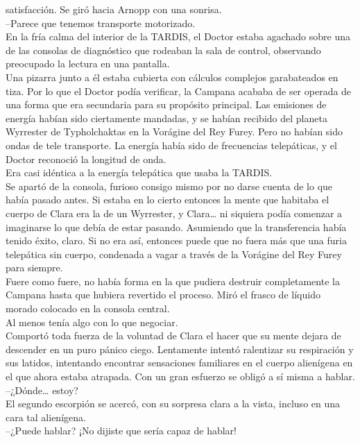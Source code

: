 satisfacción. Se giró hacia Arnopp con una sonrisa.\\
--Parece que tenemos transporte motorizado.\\[2\baselineskip]En la fría
calma del interior de la TARDIS, el Doctor estaba agachado sobre una de
las consolas de diagnóstico que rodeaban la sala de control, observando
preocupado la lectura en una pantalla.\\
Una pizarra junto a él estaba cubierta con cálculos complejos
garabateados en tiza. Por lo que el Doctor podía verificar, la Campana
acababa de ser operada de una forma que era secundaria para su propósito
principal. Las emisiones de energía habían sido ciertamente mandadas, y
se habían recibido del planeta Wyrrester de Typholchaktas en la Vorágine
del Rey Furey. Pero no habían sido ondas de tele transporte. La energía
había sido de frecuencias telepáticas, y el Doctor reconoció la longitud
de onda.\\
Era casi idéntica a la energía telepática que usaba la TARDIS.\\
Se apartó de la consola, furioso consigo mismo por no darse cuenta de lo
que había pasado antes. Si estaba en lo cierto entonces la mente que
habitaba el cuerpo de Clara era la de un Wyrrester, y Clara\ldots{} ni
siquiera podía comenzar a imaginarse lo que debía de estar pasando.
Asumiendo que la transferencia había tenido éxito, claro. Si no era así,
entonces puede que no fuera más que una furia telepática sin cuerpo,
condenada a vagar a través de la Vorágine del Rey Furey para siempre.\\
Fuere como fuere, no había forma en la que pudiera destruir
completamente la Campana hasta que hubiera revertido el proceso. Miró el
frasco de líquido morado colocado en la consola central.\\
Al menos tenía algo con lo que negociar.\\[2\baselineskip]Comportó toda
fuerza de la voluntad de Clara el hacer que su mente dejara de descender
en un puro pánico ciego. Lentamente intentó ralentizar su respiración y
sus latidos, intentando encontrar sensaciones familiares en el cuerpo
alienígena en el que ahora estaba atrapada. Con un gran esfuerzo se
obligó a sí misma a hablar.\\
--¿Dónde\ldots{} estoy?\\
El segundo escorpión se acercó, con su sorpresa clara a la vista,
incluso en una cara tal alienígena.\\
--¿Puede hablar? ¡No dijiste que sería capaz de hablar!\\
